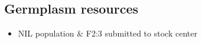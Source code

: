 \documentclass[]{article}
\begin{document}
\subsection { Germplasm resources }
\begin{itemize}
\item NIL population \& F2:3 submitted to stock center
\end{itemize}




\end{document}
